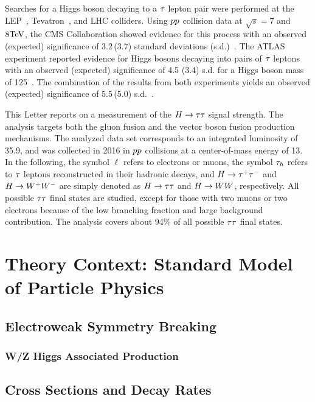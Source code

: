 Searches for a Higgs boson decaying to a $\tau$ lepton pair were performed at the LEP~\cite{Barate:2000ts,Abdallah:2003ip,Achard:2001pj,Abbiendi:2000ac},
Tevatron~\cite{Aaltonen:2012jh, Abazov:2012zj}, and LHC colliders.
Using $pp$ collision data at $\sqrt{s}=7$ and $8\mathrm{TeV}$, the CMS Collaboration showed evidence for this process with an observed\,(expected)
significance of 3.2\,(3.7) standard deviations (s.d.)~\cite{Chatrchyan:2014nva}. The ATLAS
experiment reported evidence for Higgs bosons decaying into pairs
of $\tau$ leptons with an observed (expected) significance of 4.5 (3.4)
s.d. for a Higgs boson mass of 125\GeV~\cite{Aad:2015vsa}.
The combination of the results from both experiments yields an observed (expected)
significance of 5.5\,(5.0) s.d.~\cite{Khachatryan:2016vau}.

This Letter reports on a measurement of the $H\to\tau\tau$ signal strength.
The analysis targets both the gluon fusion and the vector boson fusion production mechanisms.
The analyzed data set corresponds to an integrated luminosity of 35.9\fbinv, and was collected in 2016 in $pp$ collisions at a center-of-mass energy of
13\TeV.
In the following, the symbol $\ell$ refers to electrons or muons,
the symbol $\tau_{h}$ refers to $\tau$ leptons reconstructed in their hadronic decays, and
$H\to\tau^+\tau^-$  and $H\to W^+W^-$ are simply denoted as $H\to\tau\tau$  and $H\to WW$, respectively.
All possible $\tau\tau$ final states are studied, except for those with two muons or two electrons because of the low branching fraction and large background contribution. The analysis covers about 94\% of all possible $\tau\tau$ final states.

\section{Theory Context: Standard Model of Particle Physics}

\subsection{Electroweak Symmetry Breaking}

\subsubsection{W/Z Higgs Associated Production}

\subsection{Cross Sections and Decay Rates}

